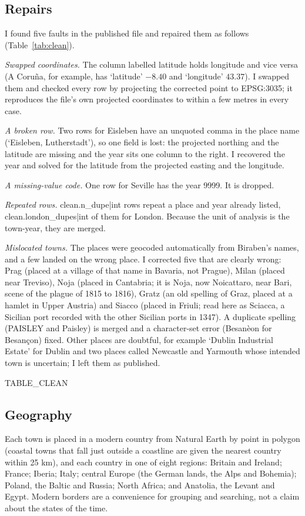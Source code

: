 \documentclass[11pt,a4paper]{article}
\begin{document}
\subsection{Repairs}
I found five faults in the published file and repaired them as follows (Table~\ref{tab:clean}).

\textit{Swapped coordinates.} The column labelled latitude holds longitude and vice versa (A Coru\~na, for example, has `latitude' $-8.40$ and `longitude' $43.37$). I swapped them and checked every row by projecting the corrected point to EPSG:3035; it reproduces the file's own projected coordinates to within a few metres in every case.

\textit{A broken row.} Two rows for Eisleben have an unquoted comma in the place name (`Eisleben, Lutherstadt'), so one field is lost: the projected northing and the latitude are missing and the year sits one column to the right. I recovered the year and solved for the latitude from the projected easting and the longitude.

\textit{A missing-value code.} One row for Seville has the year 9999. It is dropped.

\textit{Repeated rows.} {{clean.n_dupe|int}} rows repeat a place and year already listed, {{clean.london_dupes|int}} of them for London. Because the unit of analysis is the town-year, they are merged.

\textit{Mislocated towns.} The places were geocoded automatically from Biraben's names, and a few landed on the wrong place. I corrected five that are clearly wrong: Prag (placed at a village of that name in Bavaria, not Prague), Milan (placed near Treviso), Noja (placed in Cantabria; it is Noja, now Noicattaro, near Bari, scene of the plague of 1815 to 1816), Gratz (an old spelling of Graz, placed at a hamlet in Upper Austria) and Siacco (placed in Friuli; read here as Sciacca, a Sicilian port recorded with the other Sicilian ports in 1347). A duplicate spelling (PAISLEY and Paisley) is merged and a character-set error (Besan\`eon for Besan\c{c}on) fixed. Other places are doubtful, for example `Dublin Industrial Estate' for Dublin and two places called Newcastle and Yarmouth whose intended town is uncertain; I left them as published.

{{TABLE_CLEAN}}

\subsection{Geography}
Each town is placed in a modern country from Natural Earth \citep{naturalearth} by point in polygon (coastal towns that fall just outside a coastline are given the nearest country within 25 km), and each country in one of eight regions: Britain and Ireland; France; Iberia; Italy; central Europe (the German lands, the Alps and Bohemia); Poland, the Baltic and Russia; North Africa; and Anatolia, the Levant and Egypt. Modern borders are a convenience for grouping and searching, not a claim about the states of the time.
\end{document}
